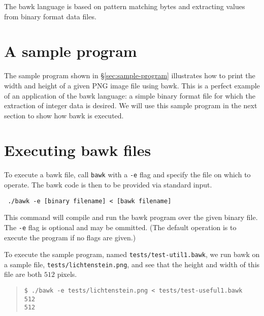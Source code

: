 
The bawk language is based on pattern matching bytes and extracting values from binary format data files.

\section{A sample program}
The sample program shown in \S\ref{sec:sample-program} illustrates how to print the width and height of a given PNG image file using bawk.  This is a perfect example of an application of the bawk language: a simple binary format file for which the extraction of integer data is desired.  We will use this sample program in the next section to show how bawk is executed.

\section{Executing bawk files}
To execute a bawk file, call \texttt{bawk} with a \texttt{-e} flag and specify the file on which to operate.  The bawk code is then to be provided via standard input.
\begin{center}\tt
./bawk -e [binary filename] < [bawk filename]
\end{center}
This command will compile and run the bawk program over the given binary file.  The \texttt{-e} flag is optional and may be ommitted.  (The default operation is to execute the program if no flags are given.)

To execute the sample program, named \texttt{tests/test-util1.bawk}, we run bawk on a sample file, \texttt{tests/lichtenstein.png}, and see that the height and width of this file are both $512$ pixels.
\begin{quote}\begin{verbatim}
$ ./bawk -e tests/lichtenstein.png < tests/test-useful1.bawk
512
512
\end{verbatim}\end{quote}

